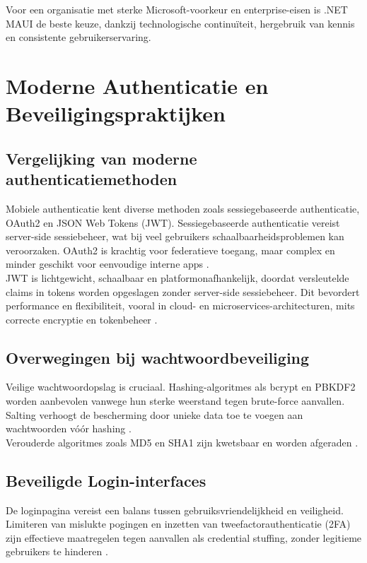 Voor een organisatie met sterke Microsoft-voorkeur en enterprise-eisen is .NET MAUI de beste keuze, dankzij technologische continuïteit, hergebruik van kennis en consistente gebruikerservaring.

\section{Moderne Authenticatie en Beveiligingspraktijken}

\subsection{Vergelijking van moderne authenticatiemethoden}
Mobiele authenticatie kent diverse methoden zoals sessiegebaseerde authenticatie, OAuth2 en JSON Web Tokens (JWT). Sessiegebaseerde authenticatie vereist server-side sessiebeheer, wat bij veel gebruikers schaalbaarheidsproblemen kan veroorzaken. OAuth2 is krachtig voor federatieve toegang, maar complex en minder geschikt voor eenvoudige interne apps \autocite{Gao2023}.\\

JWT is lichtgewicht, schaalbaar en platformonafhankelijk, doordat versleutelde claims in tokens worden opgeslagen zonder server-side sessiebeheer. Dit bevordert performance en flexibiliteit, vooral in cloud- en microservices-architecturen, mits correcte encryptie en tokenbeheer \autocite{Gao2023}.

\subsection{Overwegingen bij wachtwoordbeveiliging}
Veilige wachtwoordopslag is cruciaal. Hashing-algoritmes als bcrypt en PBKDF2 worden aanbevolen vanwege hun sterke weerstand tegen brute-force aanvallen. Salting verhoogt de bescherming door unieke data toe te voegen aan wachtwoorden vóór hashing \autocite{Gupta2022, Arias2025}.\\

Verouderde algoritmes zoals MD5 en SHA1 zijn kwetsbaar en worden afgeraden \autocite{ReesCarter2024}.

\subsection{Beveiligde Login-interfaces}
De loginpagina vereist een balans tussen gebruiksvriendelijkheid en veiligheid. Limiteren van mislukte pogingen en inzetten van tweefactorauthenticatie (2FA) zijn effectieve maatregelen tegen aanvallen als credential stuffing, zonder legitieme gebruikers te hinderen \autocite{Chinnasamy2025, Jurisons2024}.

